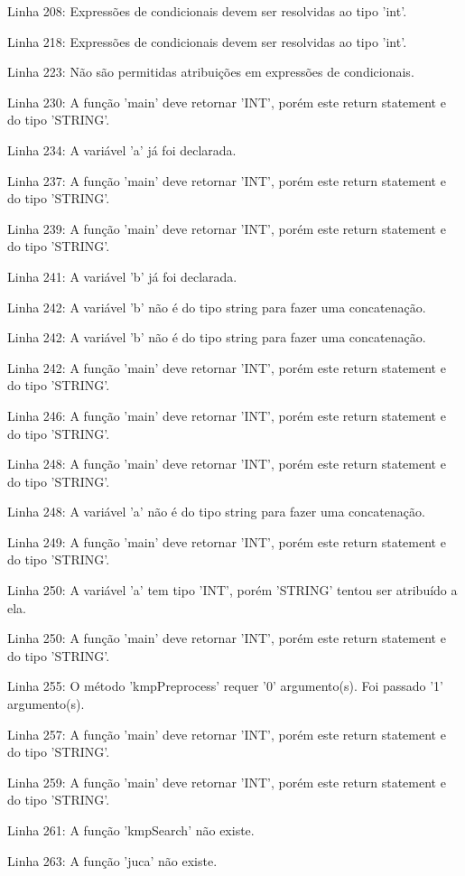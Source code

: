 \documentclass[12pt]{article}
\begin{document}
Linha 208: Expressões de condicionais devem ser resolvidas ao tipo 'int'.

Linha 218: Expressões de condicionais devem ser resolvidas ao tipo 'int'.

Linha 223: Não são permitidas atribuições em expressões de condicionais.

Linha 230: A função 'main' deve retornar 'INT', porém este return statement e do tipo 'STRING'.

Linha 234: A variável 'a' já foi declarada.

Linha 237: A função 'main' deve retornar 'INT', porém este return statement e do tipo 'STRING'.

Linha 239: A função 'main' deve retornar 'INT', porém este return statement e do tipo 'STRING'.

Linha 241: A variável 'b' já foi declarada.

Linha 242: A variável 'b' não é do tipo string para fazer uma concatenação.

Linha 242: A variável 'b' não é do tipo string para fazer uma concatenação.

Linha 242: A função 'main' deve retornar 'INT', porém este return statement e do tipo 'STRING'.

Linha 246: A função 'main' deve retornar 'INT', porém este return statement e do tipo 'STRING'.

Linha 248: A função 'main' deve retornar 'INT', porém este return statement e do tipo 'STRING'.

Linha 248: A variável 'a' não é do tipo string para fazer uma concatenação.

Linha 249: A função 'main' deve retornar 'INT', porém este return statement e do tipo 'STRING'.

Linha 250: A variável 'a' tem tipo 'INT', porém 'STRING' tentou ser atribuído a ela.

Linha 250: A função 'main' deve retornar 'INT', porém este return statement e do tipo 'STRING'.

Linha 255: O método 'kmpPreprocess' requer '0' argumento(s). Foi passado '1' argumento(s).

Linha 257: A função 'main' deve retornar 'INT', porém este return statement e do tipo 'STRING'.

Linha 259: A função 'main' deve retornar 'INT', porém este return statement e do tipo 'STRING'.

Linha 261: A função 'kmpSearch' não existe.

Linha 263: A função 'juca' não existe.
\end{document}
